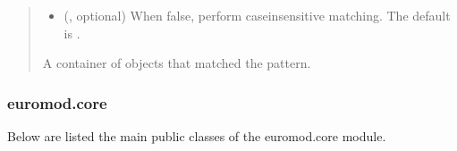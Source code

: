 \documentclass[letterpaper,10pt,english]{sphinxmanual}
\begin{document}
\begin{fulllineitems}
\begin{fulllineitems}
\begin{quote}
\begin{description}
\begin{itemize}
\item {} 
\sphinxAtStartPar
{} (, optional) \textendash{} When false, perform case\sphinxhyphen{}insensitive matching. The default is .

\end{itemize}

\sphinxAtStartPar
A container of objects that matched the pattern.

\sphinxAtStartPar
{\hyperref[\detokenize{autoapi/euromod/container/index:euromod.container.Container}]{}}

\end{description}\end{quote}

\end{fulllineitems}


\end{fulllineitems}


\sphinxstepscope


\subsubsection{euromod.core}
\label{\detokenize{autoapi/euromod/core/index:module-euromod.core}}\label{\detokenize{autoapi/euromod/core/index:euromod-core}}\label{\detokenize{autoapi/euromod/core/index::doc}}
\sphinxAtStartPar
Below are listed the main public classes of the euromod.core module.
\end{document}
